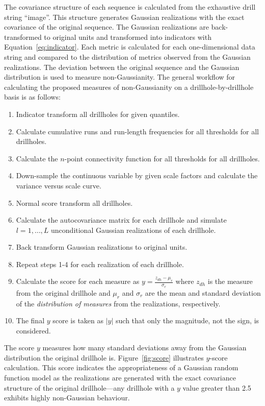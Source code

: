 The covariance structure of each sequence is calculated from the exhaustive drill string ``image''. This structure generates Gaussian realizations with the exact covariance of the original sequence. The Gaussian realizations are back-transformed to original units and transformed into indicators with Equation~\ref{eq:indicator}. Each metric is calculated for each one-dimensional data string and compared to the distribution of metrics observed from the Gaussian realizations. The deviation between the original sequence and the Gaussian distribution is used to measure non-Gaussianity. The general workflow for calculating the proposed measures of non-Gaussianity on a drillhole-by-drillhole basis is as follows:
\begin{enumerate}[noitemsep]
    \item Indicator transform all drillholes for given quantiles.
    \item Calculate cumulative runs and run-length frequencies for all thresholds for all drillholes.
    \item Calculate the $n$-point connectivity function for all thresholds for all drillholes.
    \item Down-sample the continuous variable by given scale factors and calculate the variance versus scale curve.
    \item Normal score transform all drillholes.
    \item Calculate the autocovariance matrix for each drillhole and simulate $l=1,\dots,L$ unconditional Gaussian realizations of each drillhole.
    \item Back transform Gaussian realizations to original units.
    \item Repeat steps 1-4 for each realization of each drillhole.
    \item Calculate the score for each measure as $y = \frac{z_{dh}-\mu_{r}}{\sigma_{r}}$ where $z_{dh}$ is the measure from the original drillhole and $\mu_{r}$ and $\sigma_{r}$ are the mean and standard deviation of the \emph{distribution of measures} from the realizations, respectively.
    \item The final $y$ score is taken as $\lvert y \rvert$ such that only the magnitude, not the sign, is considered.
\end{enumerate}

The score $y$ measures how many standard deviations away from the Gaussian distribution the original drillhole is. Figure~\ref{fig:score} illustrates $y$-score calculation. This score indicates the appropriateness of a Gaussian random function model as the realizations are generated with the exact covariance structure of the original drillhole—any drillhole with a $y$ value greater than 2.5 exhibits highly non-Gaussian behaviour.

